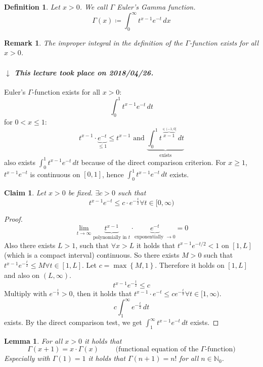 \documentclass{article}
\newtheorem{definition}{Definition}  \numberwithin{definition}{section}
\newtheorem{lemma}{Lemma}  \numberwithin{lemma}{section}
\newtheorem*{claim}{Claim}%
\newtheorem{remark}{Remark}  \numberwithin{remark}{section}
\newcommand{\set}[1]{\left\{#1\right\}}
\newcommand{\dateref}[1]{%
  \begin{mdframed}[backgroundcolor=gray!10,innerbottommargin=0pt,innertopmargin=0pt]
    \paragraph{\textit{$\downarrow$ This lecture took place on #1.}}%
  \end{mdframed}%
}
\begin{document}
\begin{definition} %
  Let $x > 0$.
  We call $\Gamma$ \emph{Euler's Gamma function}.
  \[ \Gamma(x) \coloneqq \int_0^\infty t^{x - 1} e^{-t} \, dx \]
\end{definition}

\begin{remark}
  The improper integral in the definition of the $\Gamma$-function exists for all $x > 0$.
\end{remark}

\dateref{2018/04/26}

Euler's $\Gamma$-function exists for all $x > 0$:
\[ \int_0^1 t^{x-1} e^{-t} \,dt \]
for $0 < x \leq 1$:
\[ t^{x-1} \cdot \underbrace{e^{-t}}_{\leq 1} \leq t^{x-1} \text{ and } \underbrace{\int_0^1 t^{\overbrace{x-1}^{\in (-1,0]}} \, dt}_{\text{exists}} \]
also exists $\int_0^1 t^{x-1} e^{-t} \, dt$ because of the direct comparison criterion.
For $x \geq 1$, $t^{x-1} e^{-t}$ is continuous on $[0,1]$, hence $\int_0^1 t^{x-1} e^{-t} \, dt$ exists.

\begin{claim}
  Let $x > 0$ be fixed. $\exists c > 0$ such that
  \[ t^{x-1} e^{-t} \leq c \cdot e^{-\frac t2} \forall t \in [0,\infty) \]
\end{claim}

\begin{proof}
  \[ \lim_{t\to\infty} \underbrace{t^{x-1}}_{\text{polynomially in } t} \cdot \underbrace{e^{-t}}_{\text{exponentially } \to 0} = 0 \]
  Also there exists $L > 1$, such that $\forall x > L$ it holds that $t^{x-1} e^{-t/2} < 1$ on $[1,L]$ (which is a compact interval) continuous.
  So there exists $M > 0$ such that $t^{x-1} e^{-\frac t2} \leq M \forall t \in [1,L]$.
  Let $c = \max\set{M, 1}$. Therefore it holds on $[1,L]$ and also on $(L,\infty)$.
  \[ t^{x-1} e^{-\frac t2} \leq c \]
  Multiply with $e^{-\frac t2} > 0$, then it holds that $t^{x-1} \cdot e^{-t} \leq ce^{-\frac t2} \forall t \in [1,\infty)$.
  \[ c \int_1^\infty e^{-\frac t2} \, dt \]
  exists.
  By the direct comparison test, we get $\int_1^\infty t^{x-1} e^{-t} \, dt$ exists.
\end{proof}

\begin{lemma} %
  \label{lemma13}
  For all $x > 0$ it holds that
  \[ \Gamma(x + 1) = x \cdot \Gamma(x) \qquad \text{ (functional equation of the $\Gamma$-function)} \]
  Especially with $\Gamma(1) = 1$ it holds that $\Gamma(n+1) = n!$ for all $n \in \mathbb N_0$.
\end{lemma}
\end{document}
